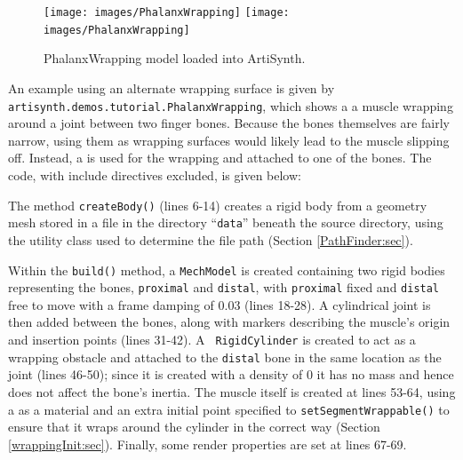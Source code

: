 \begin{figure}[t]
\begin{center}
\iflatexml
 \texttt{[image: images/PhalanxWrapping]}
\else
 \texttt{[image: images/PhalanxWrapping]}
\fi
\end{center}
\caption{PhalanxWrapping model loaded into ArtiSynth.}
\label{PhalanxWrapping:fig}
\end{figure}

An example using an alternate wrapping surface is given by {\tt
artisynth.demos.tutorial.PhalanxWrapping}, which shows a 
a muscle wrapping around a joint between two finger
bones. Because the bones themselves are fairly narrow, using them as
wrapping surfaces would likely lead to the muscle slipping
off. Instead, a  is used for the
wrapping and attached to one of the bones. The code, with include
directives excluded, is given below: \lstset{numbers=left} \iflatexml

\else

\fi
\lstset{numbers=none}

The method {\tt createBody()} (lines 6-14) creates a rigid body from a
geometry mesh stored in a file in the directory ``{\tt data}'' beneath
the source directory, using the utility class
 used to determine the file path
(Section \ref{PathFinder:sec}).

Within the {\tt build()} method, a {\tt MechModel} is created
containing two rigid bodies representing the bones, {\tt proximal} and
{\tt distal}, with {\tt proximal} fixed and {\tt distal} free to move
with a frame damping of 0.03 (lines 18-28). A cylindrical joint is
then added between the bones, along with markers describing the
muscle's origin and insertion points (lines 31-42).  A {\tt
RigidCylinder} is created to act as a wrapping obstacle and attached
to the {\tt distal} bone in the same location as the joint (lines
46-50); since it is created with a density of 0 it has no mass and
hence does not affect the bone's inertia. The muscle itself is created
at lines 53-64, using a
 as a material
and an extra initial point specified to
{\tt setSegmentWrappable()} to ensure that it wraps around
the cylinder in the correct way (Section
\ref{wrappingInit:sec}). Finally, some render properties are set at lines
67-69.

